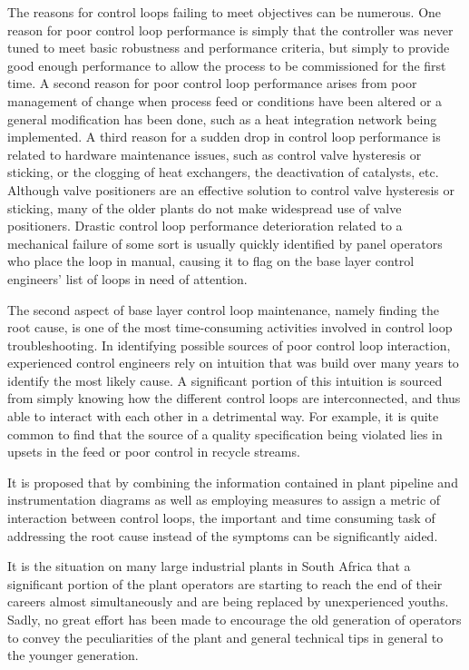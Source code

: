 \documentclass{article}
\begin{document}
The reasons for control loops failing to meet objectives can be numerous.
One reason for poor control loop performance is simply that the controller was never tuned to meet basic robustness and performance criteria, but simply to provide good enough performance to allow the process to be commissioned for the first time.
A second reason for poor control loop performance arises from poor management of change when process feed or conditions have been altered or a general modification has been done, such as a heat integration network being implemented.
A third reason for a sudden drop in control loop performance is related to hardware maintenance issues, such as control valve hysteresis or sticking, or the clogging of heat exchangers, the deactivation of catalysts, etc.
Although valve positioners are an effective solution to control valve hysteresis or sticking, many of the older plants do not make widespread use of valve positioners.
Drastic control loop performance deterioration related to a mechanical failure of some sort is usually quickly identified by panel operators who place the loop in manual, causing it to flag on the base layer control engineers' list of loops in need of attention.

The second aspect of base layer control loop maintenance, namely finding the root cause, is one of the most time-consuming activities involved in control loop troubleshooting.
In identifying possible sources of poor control loop interaction, experienced control engineers rely on intuition that was build over many years to identify the most likely cause.
A significant portion of this intuition is sourced from simply knowing how the different control loops are interconnected, and thus able to interact with each other in a detrimental way.
For example, it is quite common to find that the source of a quality specification being violated lies in upsets in the feed or poor control in recycle streams.

It is proposed that by combining the information contained in plant pipeline and instrumentation diagrams as well as employing measures to assign a metric of interaction between control loops, the important and time consuming task of addressing the root cause instead of the symptoms can be significantly aided.

It is the situation on many large industrial plants in South Africa that a significant portion of the plant operators are starting to reach the end of their careers almost simultaneously and are being replaced by unexperienced youths. Sadly, no great effort has been made to encourage the old generation of operators to convey the peculiarities of the plant and general technical tips in general to the younger generation.
\end{document}
